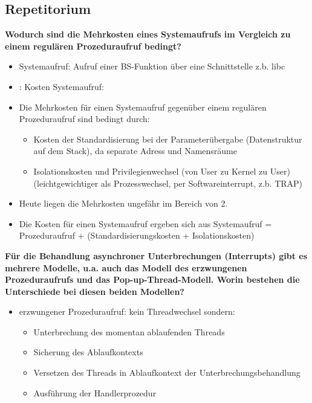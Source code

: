 \documentclass[a4paper]{article}
\begin{document}
\subsection{Repetitorium}
\begin{description*}
    \item \textbf{Wodurch sind die Mehrkosten eines Systemaufrufs im Vergleich zu einem regulären Prozeduraufruf bedingt?}
    \begin{itemize}
        \item Systemaufruf: Aufruf einer BS-Funktion über eine Schnittstelle z.b. libc
        \item: Kosten Systemaufruf:
        \item Die Mehrkosten für einen Systemaufruf gegenüber einem regulären Prozeduraufruf sind bedingt durch:
              \begin{itemize}
                  \item Kosten der Standardisierung bei der Parameterübergabe (Datenstruktur auf dem Stack), da separate Adress und Namensräume
                  \item Isolationskosten und Privilegienwechsel (von User zu Kernel zu User) (leichtgewichtiger als Prozesswechsel, per Softwareinterrupt, z.b. TRAP)
              \end{itemize}
        \item Heute liegen die Mehrkosten ungefähr im Bereich von 2.
        \item Die Kosten für einen Systemaufruf ergeben sich aus Systemaufruf = Prozeduraufruf + (Standardisierungskosten + Isolationskosten)
    \end{itemize}
    \item \textbf{Für die Behandlung asynchroner Unterbrechungen (Interrupts) gibt es mehrere Modelle, u.a. auch das Modell des erzwungenen Prozeduraufrufs und das Pop-up-Thread-Modell. Worin bestehen die Unterschiede bei diesen beiden Modellen?}
    \begin{itemize}
        \item erzwungener Prozeduraufruf: kein Threadwechsel sondern:
              \begin{itemize}
                  \item Unterbrechung des momentan ablaufenden Threads
                  \item Sicherung des Ablaufkontexts
                  \item Versetzen des Threads in Ablaufkontext der Unterbrechungsbehandlung
                  \item Ausführung der Handlerprozedur

\end{itemize}
\end{itemize}
\end{description*}
\end{document}
